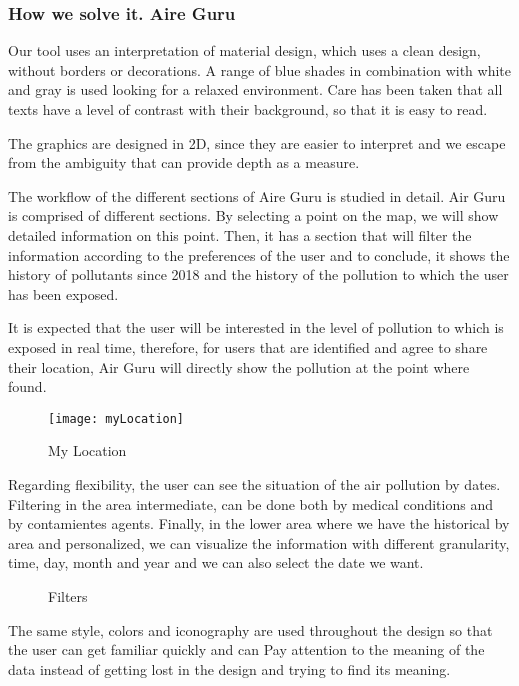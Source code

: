 \subsubsection{How we solve it. Aire Guru} 
Our tool uses an interpretation of material design, which uses a clean design, without borders or decorations.
A range of blue shades in combination with white and gray is used looking for a relaxed environment.
Care has been taken that all texts have a level of contrast with their background, so that it is easy to read.

The graphics are designed in 2D, since they are easier to interpret and we escape from the ambiguity that can
provide depth as a measure.


The workflow of the different sections of Aire Guru is studied in detail.
Air Guru is comprised of different sections. By selecting a point on the map, we
will show detailed information on this point. Then, it has a section that will filter the information according to the preferences of the user
and to conclude, it shows the history of pollutants since 2018 and the history of the pollution to which the user has been
exposed.

It is expected that the user will be interested in the level of pollution to which is exposed in real time, therefore, for users
that are identified and agree to share their location, Air Guru will directly show the pollution at the point where
found.

\begin{figure}[ht]
    \centering
    \texttt{[image: myLocation]}
    \caption{My Location}
\end{figure}

Regarding flexibility, the user can see the situation of the air pollution by dates. Filtering in the area
intermediate, can be done both by medical conditions and by contamientes agents. Finally, in the lower area where we have
the historical by area and personalized, we can visualize the information with different granularity, time, day, month and year and we can also
select the date we want.

\begin{figure}[ht]
    \centering
    \hfill
    \vfill
  
  \caption{Filters}
    \end{figure}
    The same style, colors and iconography are used throughout the design so that the user can get familiar quickly and can
    Pay attention to the meaning of the data instead of getting lost in the design and trying to find its meaning.
    
